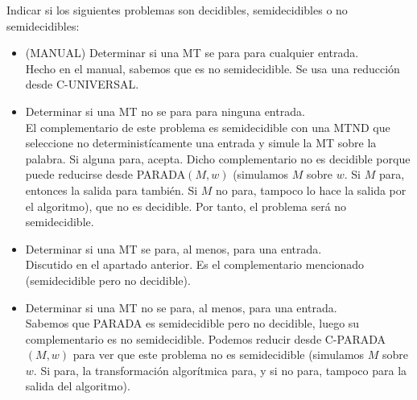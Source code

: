 \begin{ejercicio}
    Indicar si los siguientes problemas son decidibles, semidecidibles o no semidecidibles:
    \begin{itemize}
        \item[a)] (MANUAL) Determinar si una MT se para para cualquier entrada. \\
        
        Hecho en el manual, sabemos que es no semidecidible. Se usa una reducción desde C-UNIVERSAL.

        \item[b)] Determinar si una MT no se para para ninguna entrada. \\

        El complementario de este problema es semidecidible con una MTND que seleccione no deterministícamente
        una entrada y simule la MT sobre la palabra. Si alguna para, acepta. Dicho complementario no es decidible 
        porque puede reducirse desde PARADA$(M,w)$ (simulamos $M$ sobre $w$. Si $M$ para, entonces
        la salida para también. Si $M$ no para, tampoco lo hace la salida por el algoritmo), que no es decidible. 
        Por tanto, el problema será no semidecidible. 

        \item[c)] Determinar si una MT se para, al menos, para una entrada. \\
        
        Discutido en el apartado anterior. Es el complementario mencionado (semidecidible pero no decidible).

        \item[d)] Determinar si una MT no se para, al menos, para una entrada. \\
        
        Sabemos que PARADA es semidecidible pero no decidible, luego su complementario es no semidecidible. Podemos
        reducir desde C-PARADA$(M,w)$ para ver que este problema no es semidecidible (simulamos $M$ sobre $w$. 
        Si para, la transformación algorítmica para, y si no para, tampoco para la salida del algoritmo).

    \end{itemize}
\end{ejercicio}




